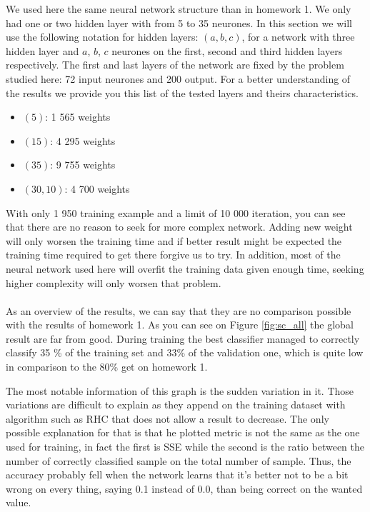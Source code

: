 \documentclass[twocolumn,a4paper,10pt]{article}
\begin{document}
We used here the same neural network structure than in homework 1.
We only had one or two hidden layer with from 5 to 35 neurones. In
this section we will use the following notation for hidden layers:
$(a,b,c)$, for a network with three hidden layer and $a$, $b$,
$c$ neurones on the first, second and third hidden layers respectively.
The first and last layers of the network are fixed by the problem
studied here: 72 input neurones and 200 output. For a better understanding
of the results we provide you this list of the tested layers and theirs
characteristics.
\begin{itemize}
\item $(5)$: 1 565 weights 
\item $(15)$: 4 295 weights 
\item $(35)$: 9 755 weights 
\item $(30,10)$: 4 700 weights 
\end{itemize}
With only 1 950 training example and a limit of 10 000 iteration,
you can see that there are no reason to seek for more complex network.
Adding new weight will only worsen the training time and if better
result might be expected the training time required to get there forgive
us to try. In addition, most of the neural network used here will
overfit the training data given enough time, seeking higher complexity
will only worsen that problem.

\paragraph{}

As an overview of the results, we can say that they are no comparison
possible with the results of homework 1. As you can see on Figure
\ref{fig:sc_all} the global result are far from good. During training
the best classifier managed to correctly classify 35 \% of the training
set and 33\% of the validation one, which is quite low in comparison
to the 80\% get on homework 1.

The most notable information of this graph is the sudden variation
in it. Those variations are difficult to explain as they append on
the training dataset with algorithm such as RHC that does not allow
a result to decrease. The only possible explanation for that is that
he plotted metric is not the same as the one used for training, in
fact the first is SSE while the second is the ratio between the number
of correctly classified sample on the total number of sample. Thus,
the accuracy probably fell when the network learns that it's better
not to be a bit wrong on every thing, saying 0.1 instead of 0.0, than
being correct on the wanted value.
\end{document}
